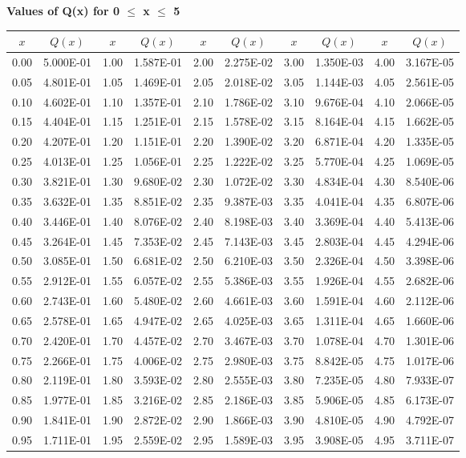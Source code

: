 \documentclass{article}
\begin{document}
\begin{center}
  {\small\textbf{Values of Q(x) for 0 $\le$ x $\le$ 5}}
\end{center}

\begin{center}
\begin{tabular}{|cc||cc||cc||cc||cc|}

	\hline
	 $x$ & $Q(x)$ & $x$ & $Q(x)$ & $x$ & $Q(x)$ & $x$ & $Q(x)$ & $x$ & $Q(x)$ \\ 
\hline
	 0.00 & 5.000E-01 & 1.00 & 1.587E-01 & 2.00 & 2.275E-02 & 3.00 & 1.350E-03 & 4.00 & 3.167E-05  \\ 
	 0.05 & 4.801E-01 & 1.05 & 1.469E-01 & 2.05 & 2.018E-02 & 3.05 & 1.144E-03 & 4.05 & 2.561E-05  \\ 
	 0.10 & 4.602E-01 & 1.10 & 1.357E-01 & 2.10 & 1.786E-02 & 3.10 & 9.676E-04 & 4.10 & 2.066E-05  \\ 
	 0.15 & 4.404E-01 & 1.15 & 1.251E-01 & 2.15 & 1.578E-02 & 3.15 & 8.164E-04 & 4.15 & 1.662E-05  \\ 
	 0.20 & 4.207E-01 & 1.20 & 1.151E-01 & 2.20 & 1.390E-02 & 3.20 & 6.871E-04 & 4.20 & 1.335E-05  \\ 
	 0.25 & 4.013E-01 & 1.25 & 1.056E-01 & 2.25 & 1.222E-02 & 3.25 & 5.770E-04 & 4.25 & 1.069E-05  \\ 
	 0.30 & 3.821E-01 & 1.30 & 9.680E-02 & 2.30 & 1.072E-02 & 3.30 & 4.834E-04 & 4.30 & 8.540E-06  \\ 
	 0.35 & 3.632E-01 & 1.35 & 8.851E-02 & 2.35 & 9.387E-03 & 3.35 & 4.041E-04 & 4.35 & 6.807E-06  \\ 
	 0.40 & 3.446E-01 & 1.40 & 8.076E-02 & 2.40 & 8.198E-03 & 3.40 & 3.369E-04 & 4.40 & 5.413E-06  \\ 
	 0.45 & 3.264E-01 & 1.45 & 7.353E-02 & 2.45 & 7.143E-03 & 3.45 & 2.803E-04 & 4.45 & 4.294E-06  \\ 
	 0.50 & 3.085E-01 & 1.50 & 6.681E-02 & 2.50 & 6.210E-03 & 3.50 & 2.326E-04 & 4.50 & 3.398E-06  \\ 
	 0.55 & 2.912E-01 & 1.55 & 6.057E-02 & 2.55 & 5.386E-03 & 3.55 & 1.926E-04 & 4.55 & 2.682E-06  \\ 
	 0.60 & 2.743E-01 & 1.60 & 5.480E-02 & 2.60 & 4.661E-03 & 3.60 & 1.591E-04 & 4.60 & 2.112E-06  \\ 
	 0.65 & 2.578E-01 & 1.65 & 4.947E-02 & 2.65 & 4.025E-03 & 3.65 & 1.311E-04 & 4.65 & 1.660E-06  \\ 
	 0.70 & 2.420E-01 & 1.70 & 4.457E-02 & 2.70 & 3.467E-03 & 3.70 & 1.078E-04 & 4.70 & 1.301E-06  \\ 
	 0.75 & 2.266E-01 & 1.75 & 4.006E-02 & 2.75 & 2.980E-03 & 3.75 & 8.842E-05 & 4.75 & 1.017E-06  \\ 
	 0.80 & 2.119E-01 & 1.80 & 3.593E-02 & 2.80 & 2.555E-03 & 3.80 & 7.235E-05 & 4.80 & 7.933E-07  \\ 
	 0.85 & 1.977E-01 & 1.85 & 3.216E-02 & 2.85 & 2.186E-03 & 3.85 & 5.906E-05 & 4.85 & 6.173E-07  \\ 
	 0.90 & 1.841E-01 & 1.90 & 2.872E-02 & 2.90 & 1.866E-03 & 3.90 & 4.810E-05 & 4.90 & 4.792E-07  \\ 
	 0.95 & 1.711E-01 & 1.95 & 2.559E-02 & 2.95 & 1.589E-03 & 3.95 & 3.908E-05 & 4.95 & 3.711E-07  \\ 



\end{tabular}
\end{center}
\end{document}
